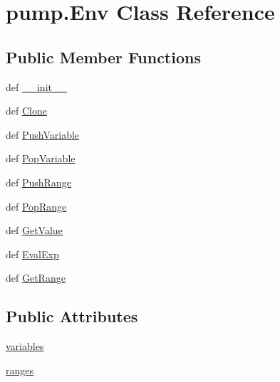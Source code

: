 \hypertarget{classpump_1_1_env}{\section{pump.\-Env Class Reference}
\label{classpump_1_1_env}
}
\subsection*{Public Member Functions}
\begin{DoxyCompactItemize}
\item 
def \hyperlink{classpump_1_1_env_affaeb1cce5e196aff25d4f6666240fbd}{\-\_\-\-\_\-init\-\_\-\-\_\-}
\item 
def \hyperlink{classpump_1_1_env_a2b4e9bb839c66f5d739e858ff047b2db}{Clone}
\item 
def \hyperlink{classpump_1_1_env_ad0765fb966016a3cef4cae363b44661b}{Push\-Variable}
\item 
def \hyperlink{classpump_1_1_env_aec61dbaa39cae91d047766864f60740a}{Pop\-Variable}
\item 
def \hyperlink{classpump_1_1_env_a54a94fe1ef84805d9ebe7c6541cb1c3d}{Push\-Range}
\item 
def \hyperlink{classpump_1_1_env_af6c077ada3f75fbae9cb7c614cda0642}{Pop\-Range}
\item 
def \hyperlink{classpump_1_1_env_ac1d876e7341ead1b86e801f675acdec8}{Get\-Value}
\item 
def \hyperlink{classpump_1_1_env_a6a1d78af34255f123e64ce43490cbd18}{Eval\-Exp}
\item 
def \hyperlink{classpump_1_1_env_affb628f7f5a44ea4be068ec258dbf558}{Get\-Range}
\end{DoxyCompactItemize}
\subsection*{Public Attributes}
\begin{DoxyCompactItemize}
\item 
\hyperlink{classpump_1_1_env_aba6456f3d0d23ac92bc9508c1b966bcd}{variables}
\item 
\hyperlink{classpump_1_1_env_a8d5fec087c1a9108de9b105922b34309}{ranges}
\end{DoxyCompactItemize}


